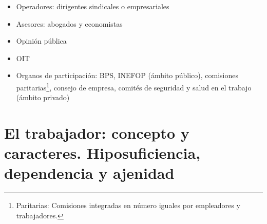 \documentclass[spanish,12pt,a4paper,titlepage]{report}
\begin{document}
\begin{itemize}
\begin{itemize}
\begin{itemize}
			\item Actúa como administrador de trabajo
			\begin{itemize}
				\item La policía del trabajo. Contralor del cumplimiento y observancia de normas laborales
				\item Desarrollar la administración del trabajo.
				\item Tiene que ser parte de una actividad global destinada a poner en práctica una política social determinada (gracias HHB\footnote{El Gran Gran Héctor Hugo Barbagelata, también conocido como \textit{patty El pistolerA}.}). Presta información técnica a ambas partes.
				\item \textbf{Su participación incluye las tareas de inspección de trabajo, participación activa en la preparación, adopción y revisión de normas laborales e intervención en las relaciones laborales}
			\end{itemize}
			\item Actúa como juez
			\begin{itemize}
				\item Administra la justicia.
				\item Aclara conflictos de trabajo.
			\end{itemize}
			\item Actúa como partícipe en la comunidad internacional
			\begin{itemize}
				\item Interviene en organismos (OIT)
				\item Regulaciones internacionales del trabajo, relaciones laborales y seguridad social: tratados, convenciones, declaraciones...
			\end{itemize}
		\end{itemize} 
		\item Operadores: dirigentes sindicales o empresariales
		\item Asesores: abogados y economistas
		\item Opinión pública
		\item OIT
		\item Organos de participación: BPS, INEFOP (ámbito público), comisiones paritarias\footnote{Paritarias: Comisiones integradas en número iguales por empleadores y trabajadores.}, consejo de empresa, comités de seguridad y salud en el trabajo (ámbito privado)
	\end{itemize}
\end{itemize}

\section{El trabajador: concepto y caracteres. Hiposuficiencia, dependencia y ajenidad}
\end{document}
